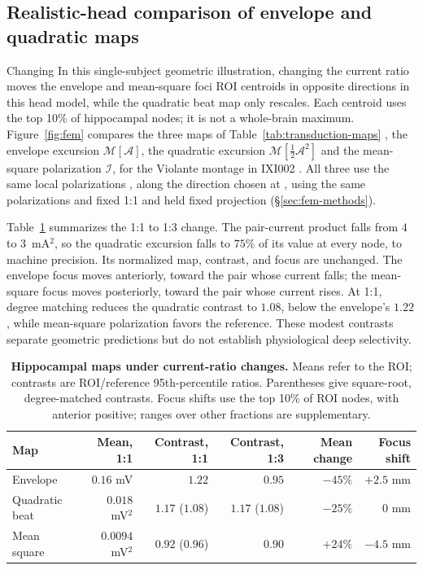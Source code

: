 \documentclass[11pt,a4paper]{article}
\providecommand{\DIFaddtex}[1]{{\protect\color{blue} \sf #1}} %
\providecommand{\DIFdeltex}[1]{{\protect\color{red} \scriptsize #1}} %
\providecommand{\DIFaddbegin}{} %
\providecommand{\DIFaddend}{} %
\providecommand{\DIFdelbegin}{} %
\providecommand{\DIFdelend}{} %
\providecommand{\DIFadd}[1]{\texorpdfstring{\DIFaddtex{#1}}{#1}} %
\providecommand{\DIFdel}[1]{\texorpdfstring{\DIFdeltex{#1}}{}} %
\begin{document}
\subsection{Realistic-head comparison of envelope and quadratic maps}\label{sec:fem-results}
\DIFdelbegin \DIFdel{Changing }\DIFdelend \DIFaddbegin \DIFadd{In this single-subject geometric illustration, changing }\DIFaddend the current ratio
moves the envelope and mean-square \DIFdelbegin \DIFdel{foci }\DIFdelend \DIFaddbegin \DIFadd{ROI centroids }\DIFaddend in opposite directions\DIFdelbegin \DIFdel{in this head model}\DIFdelend ,
while the quadratic beat map only rescales. \DIFaddbegin \DIFadd{Each centroid uses the top 10\%
of hippocampal nodes; it is not a whole-brain maximum.
}\DIFaddend Figure~\ref{fig:fem} compares the \DIFdelbegin \DIFdel{three }\DIFdelend maps of Table~\ref{tab:transduction-maps}
\DIFdelbegin \DIFdel{, the
envelope excursion $\mathcal M[\mathcal A]$, the quadratic excursion
$\mathcal M[\tfrac12\mathcal A^2]$ and the mean-square polarization $\mathcal I$, }\DIFdelend for the Violante montage in IXI002\DIFdelbegin \DIFdel{. All three use the same local polarizations , along the direction chosen at
}\DIFdelend \DIFaddbegin \DIFadd{, using the same polarizations and fixed
}\DIFaddend 1:1 \DIFdelbegin \DIFdel{and held fixed }\DIFdelend \DIFaddbegin \DIFadd{projection }\DIFaddend (\S\ref{sec:fem-methods}).

Table~\ref{tab:fem-summary} summarizes the 1:1 to 1:3 change. The pair-current
product falls from $4$ to $3$~mA$^2$, so the quadratic excursion falls to $75\%$
of its value at every node, to machine precision. Its normalized map, contrast, and focus
are unchanged. The envelope focus moves anteriorly, toward the pair whose current
falls; the mean-square focus moves posteriorly, toward the pair whose current rises.
At 1:1, degree matching reduces the quadratic contrast to $1.08$, below the
envelope's $1.22$, while mean-square polarization favors the reference. \DIFaddbegin \DIFadd{These modest contrasts
separate geometric predictions but do not establish physiological deep selectivity.
}\DIFaddend

\begin{table}[htbp]
\centering\small
\caption{\textbf{Hippocampal maps under current-ratio changes.} Means refer to the
ROI; contrasts are ROI/reference 95th-percentile ratios. Parentheses give
square-root, degree-matched contrasts. Focus shifts use the top 10\% of ROI
nodes, with anterior positive; ranges over other fractions are supplementary.}
\label{tab:fem-summary}
\begin{tabular}{@{}lrrrrr@{}}
\toprule
Map & Mean, 1:1 & Contrast, 1:1 & Contrast, 1:3 & Mean change & Focus shift\\
\midrule
Envelope & $0.16$ mV & $1.22$ & $0.95$ & $-45\%$ & $+2.5$ mm\\
Quadratic beat & $0.018$ mV$^2$ & $1.17$ ($1.08$) & $1.17$ ($1.08$) & $-25\%$ & $0$ mm\\
Mean square & $0.0094$ mV$^2$ & $0.92$ ($0.96$) & $0.90$ & $+24\%$ & $-4.5$ mm\\
\bottomrule
\end{tabular}
\end{table}
\end{document}
